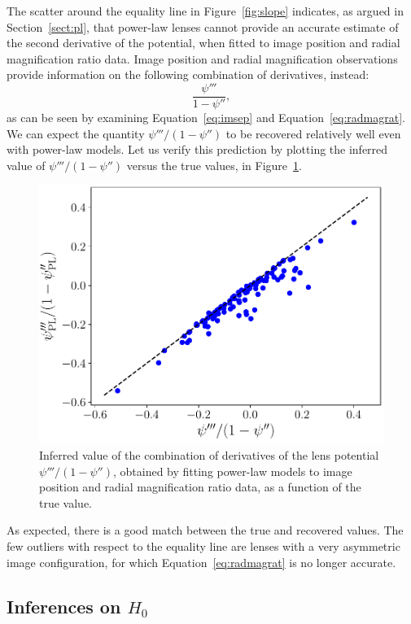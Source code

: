 \documentclass[usenatbib]{mnras}
\def\psiii{\psi''}
\def\psiiii{\psi'''}
\def\Sref#1{Section~\ref{#1}\xspace}
\def\Fref#1{Figure~\ref{#1}\xspace}
\def\Eref#1{Equation~\ref{#1}\xspace}
\begin{document}
The scatter around the equality line in \Fref{fig:slope} indicates, as argued in \Sref{sect:pl}, that power-law lenses cannot provide an accurate estimate of the second derivative of the potential, when fitted to image position and radial magnification ratio data.
Image position and radial magnification observations provide information on the following combination of derivatives, instead:
\begin{equation}\label{eq:psicomb}
\frac{\psiiii}{1 - \psiii},
\end{equation}
as can be seen by examining \Eref{eq:imsep} and \Eref{eq:radmagrat}.
We can expect the quantity $\psiiii/(1-\psiii)$ to be recovered relatively well even with power-law models. Let us verify this prediction by plotting the inferred value of $\psiiii/(1-\psiii)$ versus the true values, in \Fref{fig:psicomb}.
%
\begin{figure}
 \includegraphics[width=\columnwidth]{psicomb-eps-converted-to.pdf}
 \caption{
Inferred value of the combination of derivatives of the lens potential $\psiiii/(1-\psiii)$, obtained by fitting power-law models to image position and radial magnification ratio data, as a function of the true value. 
}
 \label{fig:psicomb}
\end{figure}
%
As expected, there is a good match between the true and recovered values.
The few outliers with respect to the equality line are lenses with a very asymmetric image configuration, for which \Eref{eq:radmagrat} is no longer accurate.

\subsection{Inferences on $H_0$}
\end{document}
